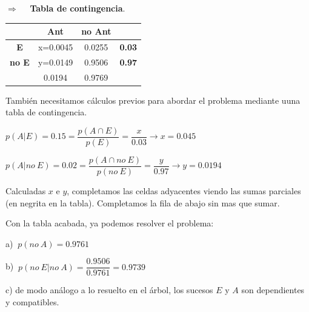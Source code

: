 \begin{example}
\begin{ejre}
\vspace{4mm} $\boldsymbol{\Rightarrow}\quad $ \textbf{Tabla de contingencia}.
	
\begin{multicols}{2}	
\begin{table}[H]
\centering
\begin{tabular}{c|c|c|c}
 & \textbf{Ant} & \textbf{no Ant} & \textbf{} \\ \hline
\textbf{E} & x=0.0045 & 0.0255 & \textbf{0.03} \\ \hline
\textbf{no E} & y=0.0149 & 0.9506 & \textbf{0.97} \\ \hline
\textbf{} & 0.0194 & 0.9769 & 
\end{tabular}
\end{table}
También necesitamos cálculos previos para abordar el problema mediante uuna tabla de contingencia.
\end{multicols}

$p(A|E)=0.15=\dfrac{p(A\cap E)}{p(E)}=\dfrac{x}{0.03} \to x=0.045$

$p(A|no\ E)=0.02=\dfrac{p(A\cap no\ E)}{p(no\ E)}=\dfrac{y}{0.97} \to y=0.0194$

Calculadas $x$ e $y$, completamos las celdas adyacentes viendo las sumas parciales (en negrita en la tabla). Completamos la fila de abajo sin mas que sumar.

Con la tabla acabada, ya podemos resolver el problema:

a) $\ p(no \ A)=0.9761$

b) $\ p(no \ E | no\ A)=	\dfrac{0.9506}{0.9761}=0.9739$

c) de modo análogo a lo resuelto en el árbol, los sucesos $E$ y $A$ son dependientes y compatibles.
\end{ejre}	
\end{example}


